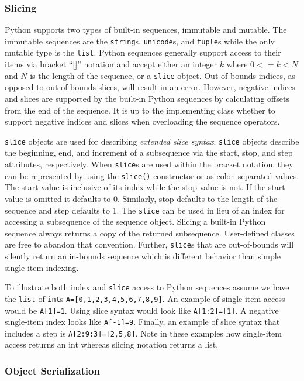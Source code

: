 \documentclass{sigplanconf}
\begin{document}
\subsubsection{Slicing}

Python supports two types of built-in sequences, immutable and mutable. The
immutable sequences are the \texttt{string}s, \texttt{unicode}s, and
\texttt{tuple}s while the only mutable type is the \texttt{list}. Python
sequences generally support access to their items via bracket “[]” notation
and accept either an integer $k$ where $0 <= k < N$ and $N$ is the length of
the sequence, or a \texttt{slice} object. Out-of-bounds indices, as opposed to
out-of-bounds slices, will result in an error. However, negative indices and
slices are supported by the built-in Python sequences by calculating offsets
from the end of the sequence.  It is up to the implementing class whether to
support negative indices and slices when overloading the sequence operators.

\texttt{slice} objects are used for describing \emph{extended slice syntax}.
\texttt{slice} objects describe the beginning, end, and increment of a
subsequence via the start, stop, and step attributes, respectively. When
\texttt{slice}s are used within the bracket notation, they can be represented
by using the \texttt{slice()} constructor or as colon-separated values. The
start value is inclusive of its index while the stop value is not. If the
start value is omitted it defaults to 0. Similarly, stop defaults to the
length of the sequence and step defaults to 1. The \texttt{slice} can be used
in lieu of an index for accessing a subsequence of the sequence object.
Slicing a built-in Python sequence always returns a copy of the returned
subsequence. User-defined classes are free to abandon that convention.
Further, \texttt{slice}s that are out-of-bounds will silently return an
in-bounds sequence which is different behavior than simple single-item
indexing.

To illustrate both index and \texttt{slice} access to Python sequences assume
we have the \texttt{list} of \texttt{int}s \texttt{A=[0,1,2,3,4,5,6,7,8,9]}.
An example of single-item access would be \texttt{A[1]=1}. Using slice syntax
would look like \texttt{A[1:2]=[1]}. A negative single-item index looks like
\texttt{A[-1]=9}.  Finally, an example of slice syntax that includes a step is
\texttt{A[2:9:3]=[2,5,8]}.  Note in these examples how single-item access
returns an int whereas slicing notation returns a list.

\subsubsection{Object Serialization}
\end{document}
